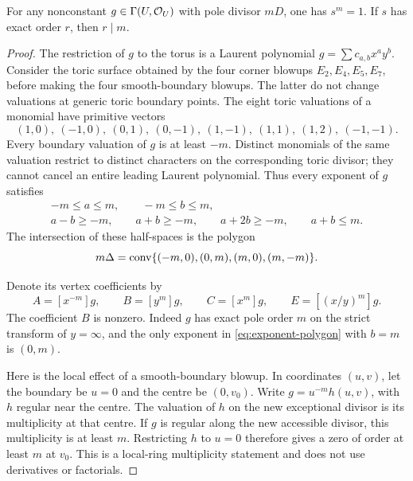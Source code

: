 \begin{lemma}\label{lem:pole-order}
For any nonconstant \(g\in\Gamma(U,\mathcal O_U)\) with pole divisor
\(mD\), one has \(s^m=1\). If \(s\) has exact order \(r\),
then \(r\mid m\).
\end{lemma}

\begin{proof}
The restriction of \(g\) to the torus is a Laurent polynomial
\(g=\sum c_{a,b}x^ay^b\). Consider the toric surface obtained by
the four corner blowups \(E_2,E_4,E_5,E_7\), before making the four
smooth-boundary blowups. The latter do not change valuations at
generic toric boundary points. The eight toric valuations of a monomial
have primitive vectors
\begin{equation}\label{eq:valuation-vectors}
(1,0),\ (-1,0),\ (0,1),\ (0,-1),\
(1,-1),\ (1,1),\ (1,2),\ (-1,-1).
\end{equation}
Every boundary valuation of \(g\) is at least \(-m\).
Distinct monomials of the same valuation restrict to distinct
characters on the corresponding toric divisor; they cannot cancel an
entire leading Laurent polynomial. Thus every exponent of \(g\)
satisfies
\begin{gather*}
-m\le a\le m,\qquad -m\le b\le m,\\
a-b\ge-m,\qquad a+b\ge-m,\qquad
a+2b\ge-m,\qquad a+b\le m.
\end{gather*}
The intersection of these half-spaces is the polygon
\begin{equation}\label{eq:exponent-polygon}
m\Delta=\operatorname{conv}\{(-m,0),(0,m),(m,0),(m,-m)\}.
\end{equation}

Denote its vertex coefficients by
\begin{equation}\label{eq:vertex-coefficients}
A=[x^{-m}]g,\qquad B=[y^m]g,\qquad
C=[x^m]g,\qquad E=[(x/y)^m]g.
\end{equation}
The coefficient \(B\) is nonzero. Indeed \(g\) has exact pole
order \(m\) on the strict transform of \(y=\infty\), and the
only exponent in \eqref{eq:exponent-polygon} with \(b=m\) is
\((0,m)\).

Here is the local effect of a smooth-boundary blowup. In coordinates
\((u,v)\), let the boundary be \(u=0\) and the centre be
\((0,v_0)\). Write \(g=u^{-m}h(u,v)\), with \(h\) regular near
the centre. The valuation of \(h\) on the new exceptional divisor
is its multiplicity at that centre. If \(g\) is regular along the
new accessible divisor, this multiplicity is at least \(m\).
Restricting \(h\) to \(u=0\) therefore gives a zero of order
at least \(m\) at \(v_0\). This is a local-ring multiplicity
statement and does not use derivatives or factorials.


\end{proof}
